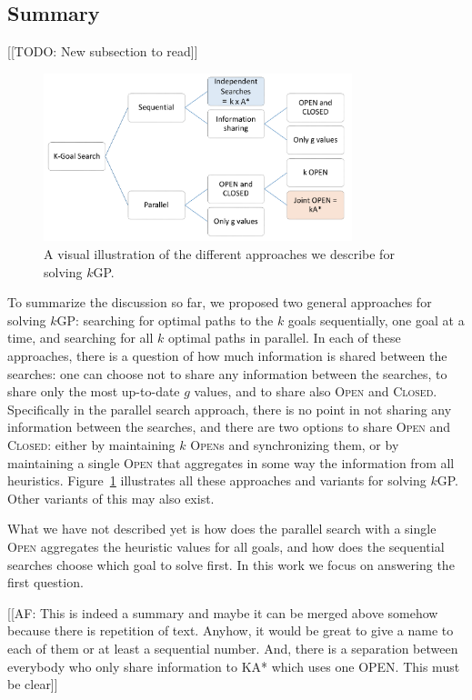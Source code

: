 \documentclass[twoside,11pt]{article}
\newcommand{\kgs}{$k$GP\xspace}
\newcommand{\open}{\textsc{Open}\xspace}
\newcommand{\closed}{\textsc{Closed}\xspace}
\newcommand{\roni}[1]{\textbf{[RS:#1]}}
\begin{document}
\subsection{Summary}
[[TODO: New subsection to read]]
\begin{figure}
\centering
\includegraphics[width=0.8\textwidth]{k-goal-approaches}
\caption{A visual illustration of the different approaches we describe for solving \kgs.}
\label{fig:approaches}
\end{figure}

To summarize the discussion so far, we proposed two general approaches for solving \kgs: searching for optimal paths to the $k$ goals sequentially, one goal at a time, and searching for all $k$ optimal paths in parallel.
In each of these approaches, there is a question of how much information is shared between the searches: one can choose not to share any information between the searches, to share only the most up-to-date $g$ values, and to share also \open and \closed.
Specifically in the parallel search approach, there is no point in not sharing any information between the searches, and there are two options to share \open and \closed: either by maintaining $k$ \open{}s and synchronizing them, or by maintaining a single \open that aggregates in some way the information from all heuristics.
Figure~\ref{fig:approaches} illustrates all these approaches and variants for solving \kgs.
Other variants of this may also exist.

What we have not described yet is how does the parallel search with a single \open aggregates the heuristic values for all goals, and how does the sequential searches choose which goal to solve first. In this work we focus on answering the first question.

[[AF: This is indeed a summary and maybe it can be merged above somehow because there is repetition of text. Anyhow, it would be great to give a name to each of them or at least a sequential number.  And, there is a separation between everybody who only share information to KA* which uses one OPEN. This must be clear]]
\end{document}

